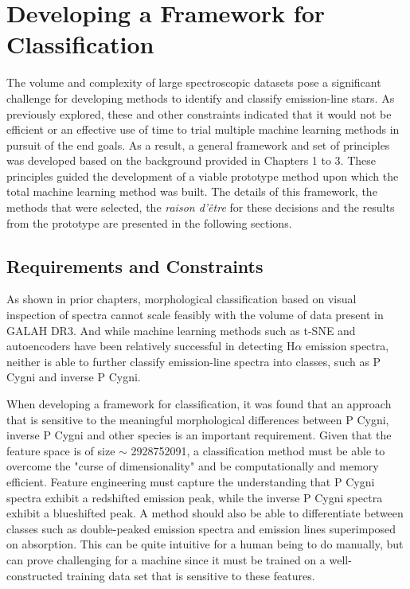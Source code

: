 \chapter{Developing a Framework for Classification}

The volume and complexity of large spectroscopic datasets pose a significant challenge for developing methods to identify and classify emission-line stars. As previously explored, these and other constraints indicated that it would not be efficient or an effective use of time to trial multiple machine learning methods in pursuit of the end goals. As a result, a general framework and set of principles was developed based on the background provided in Chapters 1 to 3. These principles guided the development of a viable prototype method upon which the total machine learning method was built. The details of this framework, the methods that were selected, the {\em raison d'être} for these decisions and the results from the prototype are presented in the following sections.

\section{Requirements and Constraints}

As shown in prior chapters, morphological classification based on visual inspection of spectra cannot scale feasibly with the volume of data present in GALAH DR3. And while machine learning methods such as t-SNE and autoencoders \citep{traven2017galah, vcotar2021galah} have been relatively successful in detecting H$\alpha$ emission spectra, neither is able to further classify emission-line spectra into classes, such as P Cygni and inverse P Cygni.

When developing a framework for classification, it was found that an approach that is sensitive to the meaningful morphological differences between P Cygni, inverse P Cygni and other species is an important requirement. Given that the feature space is of size $\sim$ \num[round-precision=2,round-mode=figures, scientific-notation=true]{2928752091}, a classification method must be able to overcome the "curse of dimensionality" and be computationally and memory efficient. Feature engineering must capture the understanding that P Cygni spectra exhibit a redshifted emission peak, while the inverse P Cygni spectra exhibit a blueshifted peak. A method should also be able to differentiate between classes such as double-peaked emission spectra and emission lines superimposed on absorption. This can be quite intuitive for a human being to do manually, but can prove challenging for a machine since it must be trained on a well-constructed training data set that is sensitive to these features. 

